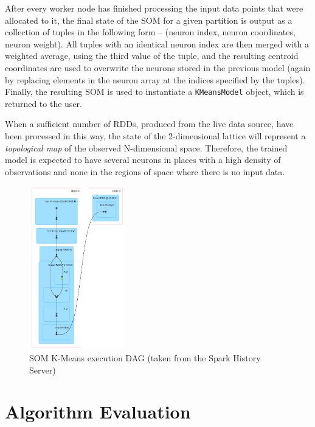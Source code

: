 \documentclass{l4proj}
\begin{document}
After every worker node has finished processing the input data points that were allocated to it, the final state of the SOM for a given partition is output as a collection of tuples in the following form -- (neuron index, neuron coordinates, neuron weight). All tuples with an identical neuron index are then merged with a weighted average, using the third value of the tuple, and the resulting centroid coordinates are used to overwrite the neurons stored in the previous model (again by replacing elements in the neuron array at the indices specified by the tuples). Finally, the resulting SOM is used to instantiate a \texttt{KMeansModel} object, which is returned to the user.

When a sufficient number of RDDs, produced from the live data source, have been processed in this way, the state of the 2-dimensional lattice will represent a \textit{topological map} of the observed N-dimensional space. Therefore, the trained model is expected to have several neurons in places with a high density of observations and none in the regions of space where there is no input data.

\begin{figure}[H]
	\centering
    \label{fig:dag8}
    \includegraphics[width=0.37\textwidth]{images/DAG8}
    \caption{SOM K-Means execution DAG (taken from the Spark History Server)} 
\end{figure}


\chapter{Algorithm Evaluation}
\label{eval}
\end{document}
